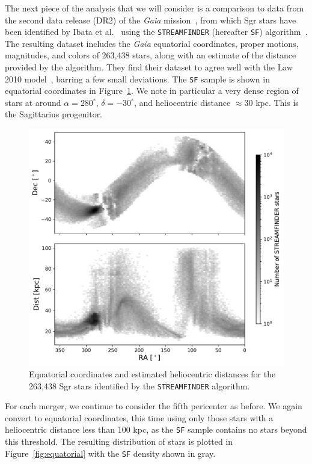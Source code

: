 The next piece of the analysis that we will consider is a comparison to data
from the second data release (DR2) of the \textit{Gaia}
mission~\cite{lindegren_gaia_2018,gaia_collaboration_gaia_2018}, from which Sgr
stars have been identified by Ibata et al.~\cite{ibata_panoramic_2020} using the
\verb|STREAMFINDER| (hereafter \verb|SF|)
algorithm~\cite{malhan_streamfinder_2018, malhan_ghostly_2018}.  The resulting
dataset includes the \textit{Gaia} equatorial coordinates, proper motions,
magnitudes, and colors of 263,438 stars, along with an estimate of the
distance provided by the algorithm.  They find their dataset to agree well
with the Law 2010 model~\cite{law_sagittarius_2010}, barring a few small
deviations.  The \verb|SF| sample is shown in equatorial coordinates in
Figure~\ref{fig:streamfinder}.  We note in particular a very dense region of
stars at around $\alpha = 280^\circ$, $\delta = -30^\circ$, and heliocentric
distance $\approx 30$ kpc.  This is the Sagittarius progenitor.

\begin{figure}
    \centering 
    \includegraphics[width=0.7\linewidth]{figs/streamfinder.pdf}
    \caption{%
        Equatorial coordinates and estimated heliocentric distances for the
        263,438 Sgr stars identified by the \texttt{STREAMFINDER} algorithm.
    }
    \label{fig:streamfinder}
\end{figure}

For each merger, we continue to consider the fifth pericenter as before. We
again convert to equatorial coordinates, this time using only those stars with a
heliocentric distance less than 100 kpc, as the \verb|SF| sample
contains no stars beyond this threshold. The resulting distribution of stars is
plotted in Figure~\ref{fig:equatorial} with the \verb|SF| density
shown in gray.

